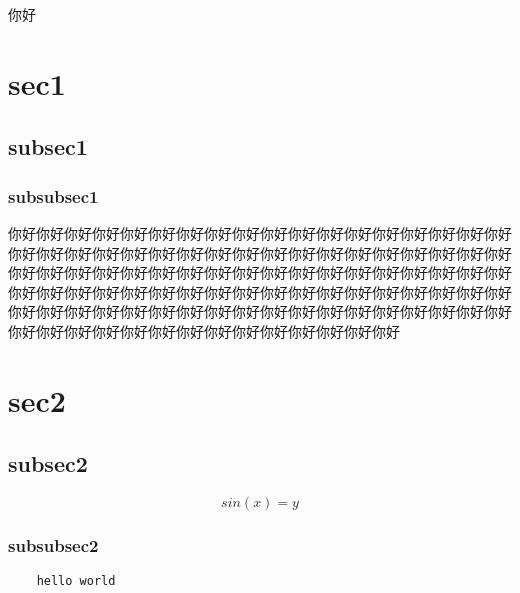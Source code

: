 \documentclass{my_class}
\begin{document}
\tableofcontents

你好

\section{sec1}
\subsection{subsec1}
\subsubsection{subsubsec1}
你好你好你好你好你好你好你好你好你好你好你好你好你好你好你好你好你好你好你好你好你好你好你好你好你好你好你好你好你好你好你好你好你好你好你好你好你好你好你好你好你好你好你好你好你好你好你好你好你好你好你好你好你好你好你好你好你好你好你好你好你好你好你好你好你好你好你好你好你好你好你好你好你好你好你好你好你好你好你好你好你好你好你好你好你好你好你好你好你好你好你好你好你好你好你好你好你好你好你好你好你好你好你好你好

\section{sec2}
\subsection{subsec2}

\begin{equation}
    sin(x) = y
\end{equation}

\subsubsection{subsubsec2}

\begin{lstlisting}
    hello world
\end{lstlisting}
\end{document}
